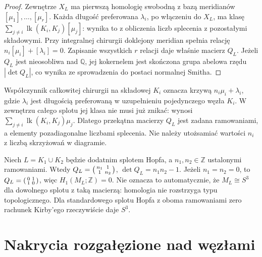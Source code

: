 \begin{proof}
Zewnętrze $X_L$ ma pierwszą homologię swobodną z bazą
meridianów $[\mu_1],\ldots,[\mu_r]$. Każda długość
preferowana $\lambda_i$, po włączeniu do $X_L$,
ma klasę $\sum_{j\ne i}\operatorname{lk}(K_i,K_j)[\mu_j]$:
wynika to z obliczenia liczb splecenia z pozostałymi
składowymi. Przy integralnej chirurgii doklejony meridian
spełnia relację $n_i[\mu_i]+[\lambda_i]=0$.
Zapisanie wszystkich $r$ relacji daje właśnie macierz $Q_L$.
Jeżeli $Q_L$ jest nieosobliwa nad $\mathbb Q$, jej
kokernelem jest skończona grupa abelowa rzędu
$|\det Q_L|$, co wynika ze sprowadzenia do postaci
normalnej Smitha.
\end{proof}

\begin{uwaga}
Współczynnik całkowitej chirurgii na składowej $K_i$
oznacza krzywą $n_i\mu_i+\lambda_i$, gdzie $\lambda_i$
jest długością preferowaną w uzupełnieniu pojedynczego węzła
$K_i$. W zewnętrzu całego splotu jej klasa nie musi już
znikać: wynosi $\sum_{j\ne i}\operatorname{lk}(K_i,K_j)\mu_j$.
Dlatego przekątna macierzy $Q_L$ jest zadana ramowaniami,
a elementy pozadiagonalne liczbami splecenia. Nie należy
utożsamiać wartości $n_i$ z liczbą skrzyżowań w diagramie.
\end{uwaga}

\begin{przyklad}
Niech $L=K_1\cup K_2$ będzie dodatnim splotem Hopfa,
a $n_1,n_2\in\mathbb Z$ ustalonymi ramowaniami.
Wtedy $Q_L=\begin{psmallmatrix}n_1&1\\1&n_2\end{psmallmatrix}$,
$\det Q_L=n_1n_2-1$. Jeżeli $n_1=n_2=0$, to
$Q_L=\begin{psmallmatrix}0&1\\1&0\end{psmallmatrix}$,
więc $H_1(M_L;\mathbb Z)=0$. Nie oznacza to automatycznie,
że $M_L\cong S^3$ dla dowolnego splotu z taką macierzą:
homologia nie rozstrzyga typu topologicznego. Dla standardowego
splotu Hopfa z oboma ramowaniami zero rachunek Kirby'ego
rzeczywiście daje $S^3$.
\end{przyklad}

\section{Nakrycia rozgałęzione nad węzłami}
\label{sec:kt-branched}

